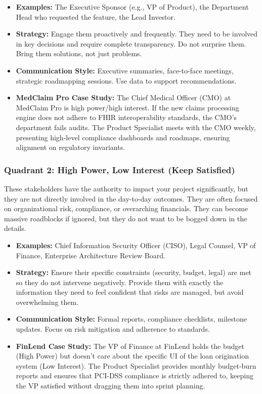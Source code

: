 \begin{itemize}
\tightlist
\item
  \textbf{Examples:} The Executive Sponsor (e.g., VP of Product), the
  Department Head who requested the feature, the Lead Investor.
\item
  \textbf{Strategy:} Engage them proactively and frequently. They need
  to be involved in key decisions and require complete transparency. Do
  not surprise them. Bring them solutions, not just problems.
\item
  \textbf{Communication Style:} Executive summaries, face-to-face
  meetings, strategic roadmapping sessions. Use data to support
  recommendations.
\item
  \textbf{MedClaim Pro Case Study:} The Chief Medical Officer (CMO) at
  MedClaim Pro is high power/high interest. If the new claims processing
  engine does not adhere to FHIR interoperability standards, the CMO's
  department fails audits. The Product Specialist meets with the CMO
  weekly, presenting high-level compliance dashboards and roadmaps,
  ensuring alignment on regulatory invariants.
\end{itemize}

\subsubsection{Quadrant 2: High Power, Low Interest (Keep
Satisfied)}\label{quadrant-2-high-power-low-interest-keep-satisfied}

These stakeholders have the authority to impact your project
significantly, but they are not directly involved in the day-to-day
outcomes. They are often focused on organizational risk, compliance, or
overarching financials. They can become massive roadblocks if ignored,
but they do not want to be bogged down in the details.

\begin{itemize}
\tightlist
\item
  \textbf{Examples:} Chief Information Security Officer (CISO), Legal
  Counsel, VP of Finance, Enterprise Architecture Review Board.
\item
  \textbf{Strategy:} Ensure their specific constraints (security,
  budget, legal) are met so they do not intervene negatively. Provide
  them with exactly the information they need to feel confident that
  risks are managed, but avoid overwhelming them.
\item
  \textbf{Communication Style:} Formal reports, compliance checklists,
  milestone updates. Focus on risk mitigation and adherence to
  standards.
\item
  \textbf{FinLend Case Study:} The VP of Finance at FinLend holds the
  budget (High Power) but doesn't care about the specific UI of the loan
  origination system (Low Interest). The Product Specialist provides
  monthly budget-burn reports and ensures that PCI-DSS compliance is
  strictly adhered to, keeping the VP satisfied without dragging them
  into sprint planning.
\end{itemize}


